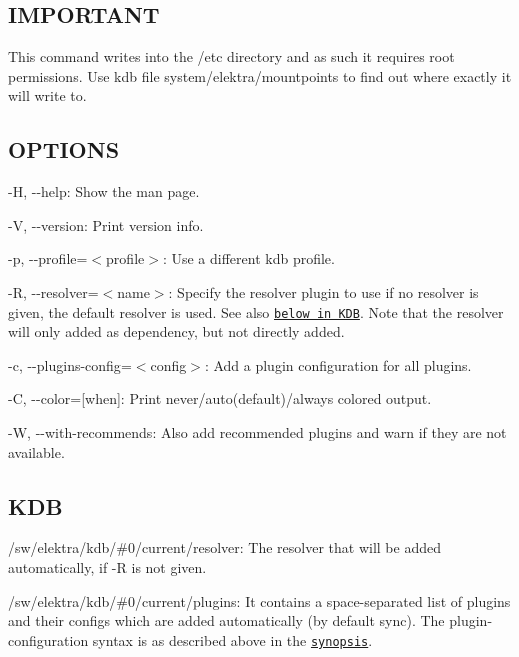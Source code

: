 \subsection*{I\+M\+P\+O\+R\+T\+A\+N\+T}

This command writes into the {\ttfamily /etc} directory and as such it requires root permissions. Use {\ttfamily kdb file system/elektra/mountpoints} to find out where exactly it will write to.

\subsection*{O\+P\+T\+I\+O\+N\+S}


\begin{DoxyItemize}
\item {\ttfamily -\/\+H}, {\ttfamily -\/-\/help}\+: Show the man page.
\item {\ttfamily -\/\+V}, {\ttfamily -\/-\/version}\+: Print version info.
\item {\ttfamily -\/p}, {\ttfamily -\/-\/profile}=$<$profile$>$\+: Use a different kdb profile.
\item {\ttfamily -\/\+R}, {\ttfamily -\/-\/resolver}=$<$name$>$\+: Specify the resolver plugin to use if no resolver is given, the default resolver is used. See also \href{#KDB}{\tt below in K\+D\+B}. Note that the resolver will only added as dependency, but not directly added.
\item {\ttfamily -\/c}, {\ttfamily -\/-\/plugins-\/config}=$<$config$>$\+: Add a plugin configuration for all plugins.
\item {\ttfamily -\/\+C}, {\ttfamily -\/-\/color}=\mbox{[}when\mbox{]}\+: Print never/auto(default)/always colored output.
\item {\ttfamily -\/\+W}, {\ttfamily -\/-\/with-\/recommends}\+: Also add recommended plugins and warn if they are not available.
\end{DoxyItemize}

\subsection*{K\+D\+B}


\begin{DoxyItemize}
\item {\ttfamily /sw/elektra/kdb/\#0/current/resolver}\+: The resolver that will be added automatically, if {\ttfamily -\/\+R} is not given.
\item {\ttfamily /sw/elektra/kdb/\#0/current/plugins}\+: It contains a space-\/separated list of plugins and their configs which are added automatically (by default sync). The plugin-\/configuration syntax is as described above in the \href{#SYNOPSIS}{\tt synopsis}.
\end{DoxyItemize}

